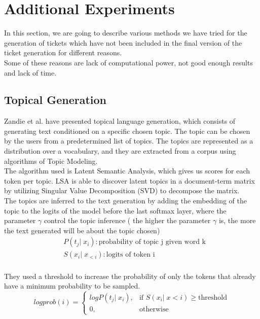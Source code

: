 \section{Additional Experiments}
\label{sec:additional_experiments}

In this section, we are going to describe various methods we have tried for the generation of tickets which have not been included in the final version of the ticket generation for different reasons. \\
Some of these reasons are lack of computational power, not good enough results and lack of time. \\

\subsection{Topical Generation}
Zandie et al.\cite{zandie2021topical} have presented topical language generation, which consists of generating text conditioned on a specific chosen topic. The topic can be chosen by the users from a predetermined list of topics. The topics are represented as a distribution over a vocabulary, and they are extracted from a corpus using algorithms of Topic Modeling. \\
The algorithm used is Latent Semantic Analysis, which gives us scores for each token per topic. LSA is able to discover latent topics in a document-term matrix by utilizing Singular Value Decomposition (SVD) to decompose the matrix. \\
The topics are inferred to the text generation by adding the embedding of the topic to the logits of the model before the last softmax layer, where the parameter $\gamma$ control the topic inference ( the higher the parameter $\gamma$ is, the more the text generated will be about the topic chosen)
\begin{equation*}
    \begin{split}
        & P(t_j|\;x_i): \text{probability of topic j given word k} \\
        & S(x_i|\;x_{<i}): \text{logits of token i} \\
    \end{split}    
\end{equation*}

They used a threshold to increase the probability of only the tokens that already have a minimum probability to be sampled.
\begin{equation*}
        logprob(i) = 
        \begin{cases}
            logP(t_j|\;x_i),& \text{if } S(x_i|\;x<i)\geq \text{threshold}\\
            0,              & \text{otherwise}
        \end{cases}
\end{equation*}

